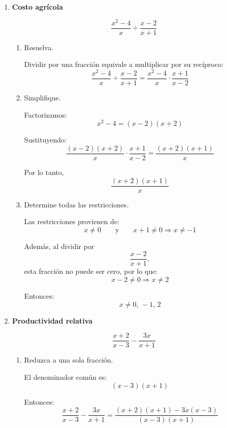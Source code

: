\documentclass[11pt]{article}
\begin{document}
\begin{enumerate}
	\newpage	
	
	\vspace*{0.5em}
	
	\item \textbf{Costo agrícola}
	
		\[
		\frac{x^2-4}{x}\div\frac{x-2}{x+1}
		\]
	
		\begin{enumerate}[label=\alph*)]
		\item Resuelva.
		
		Dividir por una fracción equivale a multiplicar por su recíproco:
		\[
		\frac{x^2-4}{x}\div\frac{x-2}{x+1}
		=
		\frac{x^2-4}{x}\cdot\frac{x+1}{x-2}
		\]
		
		\item Simplifique.
		
		Factorizamos:
		\[
		x^2-4=(x-2)(x+2)
		\]
		
		Sustituyendo:
		\[
		\frac{(x-2)(x+2)}{x}\cdot\frac{x+1}{x-2}
		=
		\frac{(x+2)(x+1)}{x}
		\]
		
		Por lo tanto,
		\[
		\boxed{\frac{(x+2)(x+1)}{x}}
		\]
		
		\item Determine todas las restricciones.
		
		Las restricciones provienen de:
		\[
		x\neq 0
		\qquad\text{y}\qquad
		x+1\neq 0 \Rightarrow x\neq -1
		\]
		
		Además, al dividir por
		\[
		\frac{x-2}{x+1},
		\]
		esta fracción no puede ser cero, por lo que:
		\[
		x-2\neq 0 \Rightarrow x\neq 2
		\]
		
		Entonces:
		\[
		\boxed{x\neq 0,\,-1,\,2}
		\]
		\end{enumerate}
	
	\vspace{0.4cm}
	
	\item \textbf{Productividad relativa}
	
		\[
		\frac{x+2}{x-3}-\frac{3x}{x+1}
		\]
	
		\begin{enumerate}[label=\alph*)]
		\item Reduzca a una sola fracción.
		
		El denominador común es:
		\[
		(x-3)(x+1)
		\]
		
		Entonces:
		\[
		\frac{x+2}{x-3}-\frac{3x}{x+1}
		=
		\frac{(x+2)(x+1)-3x(x-3)}{(x-3)(x+1)}
		\]
		

\end{enumerate}
\end{enumerate}
\end{document}
